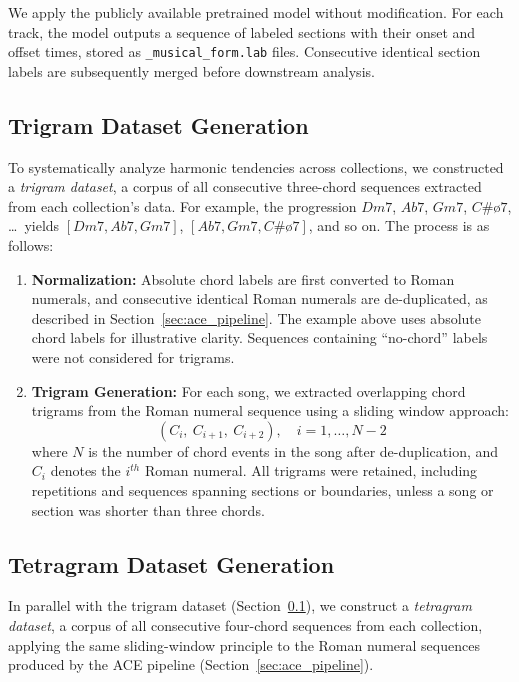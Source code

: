 \documentclass{article}
\begin{document}
We apply the publicly available pretrained model without modification. For each track, the model outputs a sequence of labeled sections with their onset and offset times, stored as \texttt{\_musical\_form.lab} files. Consecutive identical section labels are subsequently merged before downstream analysis.

\subsection{Trigram Dataset Generation}
\label{sec:trigram_generation}
To systematically analyze harmonic tendencies across collections, we constructed a \textit{trigram dataset}, a corpus of all consecutive three-chord sequences extracted from each collection's data.
For example, the progression $Dm7$, $Ab7$, $Gm7$, $C\#ø7$, \ldots\ yields $[Dm7, Ab7, Gm7]$, $[Ab7, Gm7, C\#ø7]$, and so on.
The process is as follows:

\begin{enumerate}
    \item \textbf{Normalization:} Absolute chord labels are first converted to Roman numerals, and consecutive identical Roman numerals are de-duplicated, as described in Section~\ref{sec:ace_pipeline}. The example above uses absolute chord labels for illustrative clarity. Sequences containing ``no-chord'' labels were not considered for trigrams.

    \item \textbf{Trigram Generation:}
    For each song, we extracted overlapping chord trigrams from the Roman numeral sequence using a sliding window approach:
    \[
        (C_{i},\ C_{i+1},\ C_{i+2}), \quad i = 1, \ldots, N-2
    \]
    where $N$ is the number of chord events in the song after de-duplication, and $C_i$ denotes the $i^{th}$ Roman numeral. All trigrams were retained, including repetitions and sequences spanning sections or boundaries, unless a song or section was shorter than three chords.
    
\end{enumerate}

\subsection{Tetragram Dataset Generation}
\label{sec:tetragram_generation}

In parallel with the trigram dataset (Section~\ref{sec:trigram_generation}), we construct a \textit{tetragram dataset}, a corpus of all consecutive four-chord sequences from each collection, applying the same sliding-window principle to the Roman numeral sequences produced by the ACE pipeline (Section~\ref{sec:ace_pipeline}).
\end{document}
